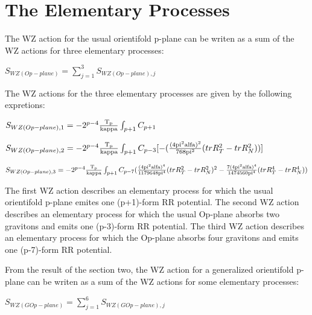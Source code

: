 \documentclass[a4paper,a4paper]{article}
\begin{document}
\section{The Elementary Processes}
The WZ action for the usual orientifold p-plane can be writen as a sum of the WZ actions for three elementary processes:

\begin{center}
{  $ S_{WZ(Op-plane)} = \sum_{j=1}^{3}S_{WZ(Op-plane),j} $ }
\end{center}
The WZ actions for the three elementary processes are given by the following 
expretions:
\begin{center}
{  $ S_{WZ(Op-plane),1} = -2^{p-4}\frac{\rm T_p}{\rm kappa}\int_{p+1} C_{p+1}$ }
\end{center} 
\begin{center}
{  $ S_{WZ(Op-plane),2} = -2^{p-4}\frac{\rm T_p}{\rm kappa}\int_{p+1} C_{p-3}[-({\frac{\rm(4pi^2alfa)^2 }{\rm 768pi^2}}{(trR_T^2- trR_N^2)})]$ }
\end{center}
\begin{center}
{  $ S_{WZ(Op-plane),3} = -2^{p-4}\frac{\rm T_p}{\rm kappa}\int_{p+1} C_{p-7}(\frac{\rm (4pi^2alfa)^4}{\rm 1179648pi^4}{{(trR_T^2- trR_N^2)^2}}-\frac{\rm 7(4pi^2alfa)^4}{\rm 1474560pi^4}{(trR_T^4- trR_N^4)})$ }
\end{center}
The first WZ action describes an elementary process for which the usual orientifold p-plane emites one (p+1)-form RR potential.
The second WZ action describes an elementary process for which the usual
Op-plane absorbs two gravitons and emits one (p-3)-form RR potential.
The third WZ action describes an elementary process for which the Op-plane absorbs four gravitons and emits one (p-7)-form RR potential.
 
From the result of the section two, the WZ action for a generalized orientifold p-plane can be writen as a sum of the WZ actions for some elementary processes:
\begin{center}
{  $ S_{WZ(GOp-plane)} = \sum_{j=1}^{6}S_{WZ(GOp-plane),j} $ }
\end{center}
\end{document}
